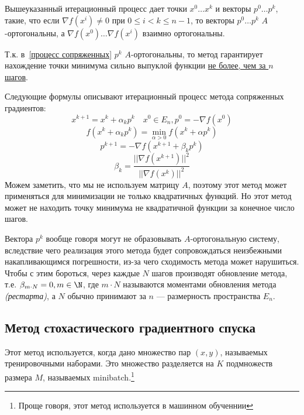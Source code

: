 Вышеуказанный итерационный процесс дает точки \(x^0 \dots x^k\) и векторы \(p^0 \dots p^k\), такие, что если \(\nabla f(x^i) \neq 0\) при \(0 \leq i < k \leq n - 1\), то векторы \(p^0 \dots p^k\) \(A\)-ортогональны, а \(\nabla f(x^0) \dots \nabla f(x^i)\) взаимно ортогональны.

Т.к. в~\eqref{процесс сопряженных} \(p^k\) \(A\)-ортогональны, то метод гарантирует нахождение точки минимума сильно выпуклой функции \underline{не более, чем за \(n\) шагов}.

Следующие формулы описывают итерационный процесс метода сопряженных градиентов:
\begin{equation}
    x^{k + 1} = x^k + \alpha_k p^k \quad x^0 \in E_n, p^0 = -\nabla f(x^0)
\end{equation}
\begin{equation}
    f(x^k + \alpha_k p^k) = \min_{\alpha > 0} f(x^k + \alpha p^k)
\end{equation}
\begin{equation}
    p^{k + 1} = - \nabla f(x^{k + 1} + \beta_k p^k)
\end{equation}
\begin{equation}
    \beta_k = \frac{||\nabla f(x^{k + 1})||^2}{||\nabla f(x^k)||^2}
\end{equation}
Можем заметить, что мы не используем матрицу \(A\), поэтому этот метод может применяться для минимизации не только квадратичных функций. Но этот метод может не находить точку минимума не квадратичной функции за конечное число шагов.

Вектора \(p^k\) вообще говоря могут не образовывать \(A\)-ортогональную систему, вследствие чего реализация этого метода будет сопровождаться неизбежными накапливающимся погрешности, из-за чего сходимость метода может нарушиться. Чтобы с этим бороться, через каждые \(N\) шагов производят обновление метода, т.е. \(\beta_{m \cdot N} = 0, m\in\N\), где \(m \cdot N\) называются моментами обновления метода \textit{(рестарта)}, а \(N\) обычно принимают за \(n\) --- размерность пространства \(E_n\).

\subsection{Метод стохастического градиентного спуска}

Этот метод используется, когда дано множество пар \((x,y)\), называемых тренировочными наборами. Это множество разделяется на \(K\) подмножеств размера \(M\), называемых minibatch.\footnote{Проще говоря, этот метод используется в машинном обученнии}

